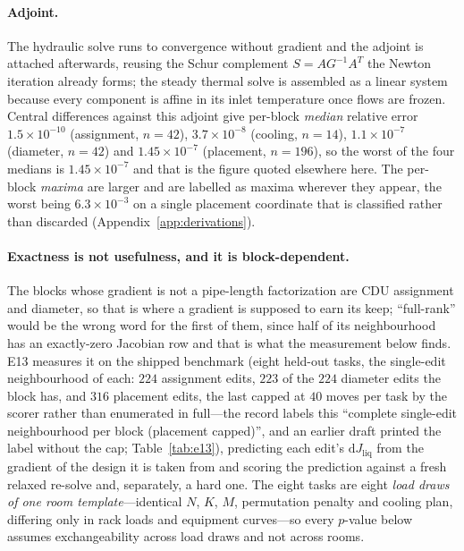 \documentclass{article}
\newcommand{\Jliq}{J_{\mathrm{liq}}}
\begin{document}
\paragraph{Adjoint.}
The hydraulic solve runs to convergence without gradient and the adjoint is
attached afterwards, reusing the Schur complement $S = A G^{-1} A^T$ the Newton
iteration already forms; the steady thermal solve is assembled as a linear
system because every component is affine in its inlet temperature once flows
are frozen.  Central differences against this adjoint give per-block
\emph{median} relative error $1.5\times10^{-10}$ (assignment, $n=42$),
$3.7\times10^{-8}$ (cooling, $n=14$), $1.1\times10^{-7}$ (diameter, $n=42$) and
$1.45\times10^{-7}$ (placement, $n=196$), so the worst of the four medians is
$1.45\times10^{-7}$ and that is the figure quoted elsewhere here.  The per-block \emph{maxima}
are larger and are labelled as maxima wherever they appear, the worst being
$6.3\times10^{-3}$ on a single placement coordinate that is classified rather than
discarded (Appendix~\ref{app:derivations}).  





\paragraph{Exactness is not usefulness, and it is block-dependent.}
The blocks whose gradient is not a pipe-length factorization are CDU assignment and
diameter, so that is where a gradient is supposed to earn its keep; ``full-rank'' would be
the wrong word for the first of them, since half of its neighbourhood has an exactly-zero
Jacobian row and that is what the measurement below finds.  E13 measures it on the shipped
benchmark (eight held-out tasks, the single-edit neighbourhood of each: $224$
assignment edits, $223$ of the $224$ diameter edits the block has, and $316$ placement
edits, the last capped at $40$ moves per task by the scorer rather than enumerated in
full---the record labels this ``complete single-edit neighbourhood per block (placement
capped)'', and an earlier draft printed the label without the cap;
Table~\ref{tab:e13}), predicting each
edit's $\mathrm{d}\Jliq$ from the gradient of the design it is taken from and scoring the
prediction against a fresh relaxed re-solve and, separately, a hard one.  The eight tasks
are eight \emph{load draws of one room template}---identical $N$, $K$, $M$, permutation
penalty and cooling plan, differing only in rack loads and equipment curves---so every
$p$-value below assumes exchangeability across load draws and not across rooms.
\end{document}
